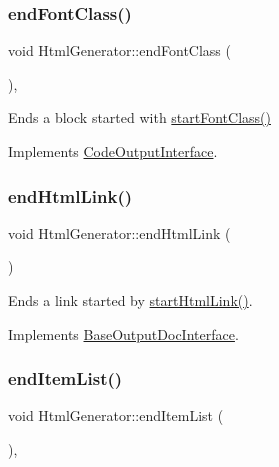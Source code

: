 \subsubsection{\texorpdfstring{endFontClass()}{endFontClass()}}
{\footnotesize\ttfamily void Html\+Generator\+::end\+Font\+Class (\begin{DoxyParamCaption}{ }\end{DoxyParamCaption})\hspace{0.3cm}{\ttfamily [inline]}, {\ttfamily [virtual]}}

Ends a block started with \mbox{\hyperlink{class_html_generator_aa600cc24896060a68612e3db6efb7dbf}{start\+Font\+Class()}} 

Implements \mbox{\hyperlink{class_code_output_interface_a2b8ac05a391dae36793aa3aa8714a0f6}{Code\+Output\+Interface}}.

\mbox{\label{class_html_generator_af6ca967739e45755318c78058115c27a}} 
\subsubsection{\texorpdfstring{endHtmlLink()}{endHtmlLink()}}
{\footnotesize\ttfamily void Html\+Generator\+::end\+Html\+Link (\begin{DoxyParamCaption}{ }\end{DoxyParamCaption})\hspace{0.3cm}{\ttfamily [virtual]}}

Ends a link started by \mbox{\hyperlink{class_html_generator_a5fdd7ff7fcabd4e301b8fec2b9c72b85}{start\+Html\+Link()}}. 

Implements \mbox{\hyperlink{class_base_output_doc_interface_afb808c1c487135d4fb2156d0675b387e}{Base\+Output\+Doc\+Interface}}.

\mbox{\label{class_html_generator_aa5dc9b6c49ebf68dd54942d258716206}} 
\subsubsection{\texorpdfstring{endItemList()}{endItemList()}}
{\footnotesize\ttfamily void Html\+Generator\+::end\+Item\+List (\begin{DoxyParamCaption}{ }\end{DoxyParamCaption})\hspace{0.3cm}{\ttfamily [inline]}, {\ttfamily [virtual]}}

